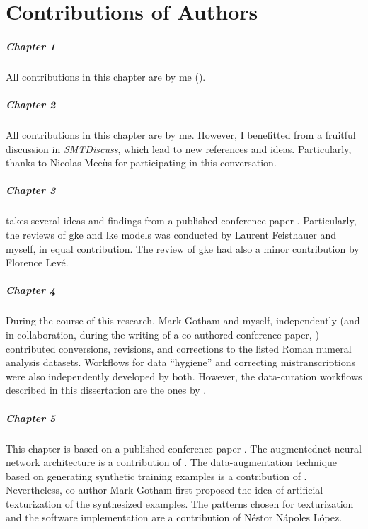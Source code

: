 \chapter*{Contributions of Authors}
\label{chap:contributionsofauthors}

\paragraph{Chapter 1}
All contributions in this chapter are by me (\myself{}).

\paragraph{Chapter 2}
All contributions in this chapter are by me. However, I
benefitted from a fruitful discussion in
\emph{SMTDiscuss},
which lead to new references and ideas. Particularly, thanks
to Nicolas Mee\`us for participating in this conversation.

\paragraph{Chapter 3} 
 takes several ideas and findings
from a published conference paper
\parencite{napoleslopez2020local}. Particularly, the reviews
of \gls{gke} and \gls{lke} models was conducted by Laurent
Feisthauer and myself, in equal contribution. The review of
\gls{gke} had also a minor contribution by Florence Lev\'e.

\paragraph{Chapter 4} 
During the course of this research, Mark Gotham and myself,
independently (and in collaboration, during the writing of a
co-authored conference paper,
\cite{napoleslopez2021augmentednet}) contributed
conversions, revisions, and corrections to the listed Roman
numeral analysis datasets. Workflows for data ``hygiene''
and correcting mistranscriptions were also independently
developed by both. However, the data-curation workflows
described in this dissertation are the ones by \myself{}. 

\paragraph{Chapter 5}
This chapter is based on a published conference paper
\parencite{napoleslopez2021augmentednet}. The
\gls{augmentednet} neural network architecture is a
contribution of \myself{}. The data-augmentation technique
based on generating synthetic training examples is a
contribution of \myself{}. Nevertheless, co-author Mark
Gotham first proposed the idea of artificial texturization
of the synthesized examples. The patterns chosen for
texturization and the software implementation are a
contribution of N\'estor N\'apoles L\'opez.

